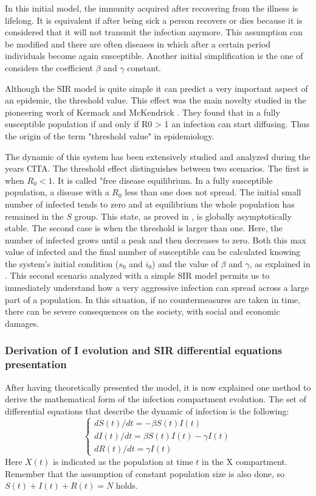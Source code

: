 In this initial model, the immunity acquired after recovering from the illness is lifelong. It is equivalent if after being sick a person recovers or dies because it is considered that it will not transmit the infection anymore.  This assumption can be modified and there are often diseases in which after a certain period individuals become again susceptible. Another initial simplification is the one of considers the coefficient $\beta$ and $\gamma$ constant. 

Although the SIR model is quite simple it can predict a very important aspect of an epidemic, the threshold value. This effect was the main novelty studied in the pioneering work of Kermack and McKendrick \cite{kermack1927}. They found that in a fully susceptible population if and only if R0 > 1 an infection can start diffusing. Thus the origin of the term "threshold value" in epidemiology. 

The dynamic of this system has been extensively studied and analyzed during the years CITA. The threshold effect distinguishes between two scenarios. The first is when $R_0 <1 $. It is called "free disease equilibrium. 
In a fully susceptible population, a disease with a $R_0$ less than one does not spread. The initial small number of infected tends to zero and at equilibrium the whole population has remained in the $S$ group. This state, as proved in \cite{Hernandez_Vargas_2022}, is globally asymptotically stable. The second case is when the threshold is larger than one. Here, the number of infected grows until a peak and then decreases to zero. Both this max value of infected and the final number of susceptible can be calculated knowing the system's initial condition ($s_0$ and $i_0$) and the value of $\beta$ and $\gamma$, as explained in \cite{Hethcote_2000}. 
This second scenario analyzed with a simple SIR model permits us to immediately understand how a very aggressive infection can spread across a large part of a population. In this situation, if no countermeasures are taken in time, there can be severe consequences on the society, with social and economic damages. 

\subsubsection{Derivation of I evolution and SIR differential equations presentation}
After having theoretically presented the model, it is now explained one method to derive the mathematical form of the infection compartment evolution. 
The set of differential equations that  describe the dynamic of infection is the following:
\begin{equation}
	\begin{cases}
		dS(t) / dt = -\beta S(t) I(t)\\
		dI(t) / dt = \beta S(t) I(t) - \gamma I(t)\\
		dR(t) / dt =  \gamma I(t)
	\end{cases}
\end{equation}
Here $X(t)$ is indicated as the population at time $t$ in the X compartment. Remember that the assumption of constant population size is also done, so $S(t)+I(t)+R(t) = N$ holds.

